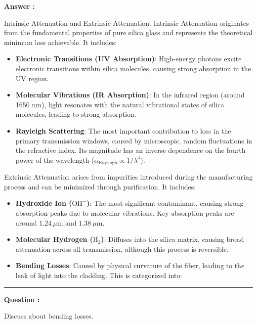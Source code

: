 \documentclass[a4paper,11pt]{book}
\newcounter{qacount}
\newenvironment{question}{
  \refstepcounter{qacount}
  \vspace{1em} %
  \noindent\textbf{Question \theqacount:}\space
}{
  \par %
}
\newenvironment{answer}{
  \noindent\textbf{Answer \theqacount:}\space
}{
  \par\vspace{1em}   %
  \hrule             %
  \vspace{0.5em}     %
}
\begin{document}
\begin{answer}
    Intrinsic Attenuation and Extrinsic Attenuation.
    Intrinsic Attenuation originates from the fundamental properties of pure silica glass and represents the theoretical minimum loss achievable. It includes:
    \begin{itemize}
        \item \textbf{Electronic Transitions (UV Absorption)}: High-energy photons excite electronic transitions within silica molecules, causing strong absorption in the UV region.
        \item \textbf{Molecular Vibrations (IR Absorption)}: In the infrared region (around 1650 nm), light resonates with the natural vibrational states of silica molecules, leading to strong absorption.
        \item \textbf{Rayleigh Scattering}: The most important contribution to loss in the primary transmission windows, caused by microscopic, random fluctuations in the refractive index. Its magnitude has an inverse dependence on the fourth power of the wavelength ($\alpha_{\text{Rayleigh}} \propto 1/\lambda^4$).
    \end{itemize}

    Extrinsic Attenuation arises from impurities introduced during the manufacturing process and can be minimized through purification. It includes:
    \begin{itemize}
        \item \textbf{Hydroxide Ion ($\text{OH}^-$)}: The most significant contaminant, causing strong absorption peaks due to molecular vibrations. Key absorption peaks are around $1.24\ \mu\text{m}$ and $1.38\ \mu\text{m}$.
        \item \textbf{Molecular Hydrogen ($\text{H}_2$)}: Diffuses into the silica matrix, causing broad attenuation across all transmission, although this process is reversible.
        \item \textbf{Bending Losses}: Caused by physical curvature of the fiber, leading to the leak of light into the cladding. This is categorized into:

    \end{itemize}
\end{answer}

\begin{question}
    Discuss about bending losses.
\end{question}
\end{document}
